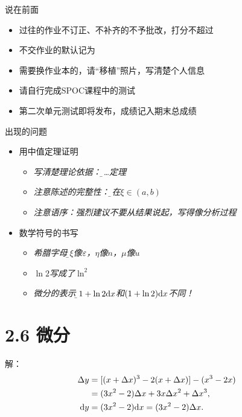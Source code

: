 
\titlepage

\begin{frame}{说在前面}
	\linespread{1.5}
	  \begin{itemize}[<+-|alert@+>]
	    \item 过往的作业不订正、不补齐的不予批改，打分不超过\,
	    \item 不交作业的默认记为\,
	    \item 需要换作业本的，请“移植”照片，写清楚个人信息
	    \item 请自行完成SPOC课程中的测试
	    \item 第二次单元测试即将发布，成绩记入期末总成绩
	  \end{itemize}
\end{frame}

\begin{frame}{出现的问题}
	\linespread{1.5}
	  \begin{itemize}[<+-|alert@+>]
	    \item 用中值定理证明
	    \begin{itemize}
	      \item \it 写清楚理论依据：\b 由\ldots 定理 
	      \item \it 注意陈述的完整性：\b 存在$\xi\in(a,b)$
	      \item \it 注意语序：强烈建议不要从结果说起，写得像分析过程
	    \end{itemize}
	    \item 数学符号的书写
	    \begin{itemize}
	      \item \it 希腊字母：\b $\xi$像$\varepsilon$，$\eta$像$n$，$\mu$像$u$
	      \item \b\it $\ln 2$写成了$\ln^2$
	      \item \it 微分的表示：\b $1+\ln2\mathrm{d} x$和$(1+\ln2)\mathrm{d} x$不同！
	    \end{itemize}
	  \end{itemize}
\end{frame}

\section{2.6 微分}

\begin{frame}
	\linespread{1.5}
	\pause
	
	
	\small 解：\it
	\begin{align*}
		\Delta y&=[(x+\Delta x)^3-2(x+\Delta x)]-(x^3-2x)\\
		&=(3x^2-2)\Delta x+3x\Delta x^2+\Delta x^3,\\
		\mathrm{d} y&=(3x^2-2)\mathrm{d} x=(3x^2-2)\Delta x.
	\end{align*}
\end{frame}

